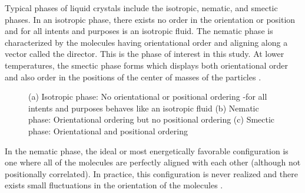 \documentclass[preprint, aps]{revtex4-1}
\begin{document}
Typical phases of liquid crystals include the isotropic, nematic, and smectic 
phases. In an isotropic phase, there exists no order in the orientation or 
position and for all intents and purposes is an isotropic fluid. The nematic 
phase is characterized by the molecules having orientational order and aligning 
along a vector called the director. This is the phase of interest in this study. 
At lower temperatures, the smectic phase forms which displays both orientational
order and also order in the positions of the center of masses of the particles
\cite{andrienko06}.
	\begin{figure}[H] 
		\centering
		\caption{(a) Isotropic phase: No orientational or positional ordering
		-for all intents and purposes behaves like an isotropic fluid (b)
		Nematic phase: Orientational ordering but no positional ordering (c) 
		Smectic phase: Orientational and positional ordering}
		\label{fig:phases}
	\end{figure}

In the nematic phase, the ideal or most energetically favorable configuration is
 one where all of the molecules are perfectly aligned with each other (although 
not positionally correlated). In practice, this configuration is 
never realized and there exists small fluctuations in the orientation of the 
molecules \cite{degennes95}.
\end{document}
